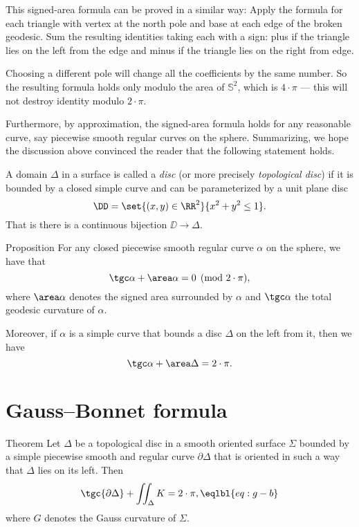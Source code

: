 This signed-area formula can be proved in a similar way:
Apply the formula for each triangle with vertex at the north pole and base at each edge of the broken geodesic.
Sum the resulting identities taking each with a sign: plus if the triangle lies on the left from the edge and minus if the triangle lies on the right from edge.

Choosing a different pole will change all the coefficients by the same number.
So the resulting formula holds only modulo the area of $\mathbb{S}^2$, which is $4\cdot \pi$ --- this will not destroy identity modulo $2\cdot\pi$.

Furthermore, by approximation, the signed-area formula holds for any reasonable curve, say piecewise smooth regular curves on the sphere.
Summarizing, we hope the discussion above convinced the reader that the following statement holds.

A domain $\Delta$ in a surface is called a \emph{disc} (or more precisely \emph{topological disc}) if it is bounded by a closed simple curve and can be parameterized by a unit plane disc 
\[\DD=\set{(x,y)\in\RR^2}{x^2+y^2\le1}.\]
That is there is a continuous bijection $\DD\to\Delta$.

\begin{thm}{Proposition}\label{prop:spherical-gb}
For any closed piecewise smooth regular curve $\alpha$ on the sphere, 
we have that 
\[\tgc\alpha+\area\alpha=0 \pmod{2\cdot\pi},\]
where $\area\alpha$ denotes the signed area surrounded by $\alpha$ and $\tgc\alpha$ the total geodesic curvature of $\alpha$.

Moreover, if $\alpha$ is a simple curve that bounds a disc $\Delta$ on the left from it, then we have 
\[\tgc\alpha+\area\Delta=2\cdot\pi.\]

\end{thm}





\section{Gauss--Bonnet formula}


\begin{thm}{Theorem}\label{thm:gb}
Let $\Delta$ be a topological disc in a smooth oriented surface $\Sigma$ bounded by a simple piecewise smooth and regular curve $\partial \Delta$ that is oriented in such a way that $\Delta$ lies on its left.
Then 
\[\tgc{\partial\Delta}+\iint_\Delta K=2\cdot \pi,\eqlbl{eq:g-b}\]
where $G$ denotes the Gauss curvature of $\Sigma$.
\end{thm}

